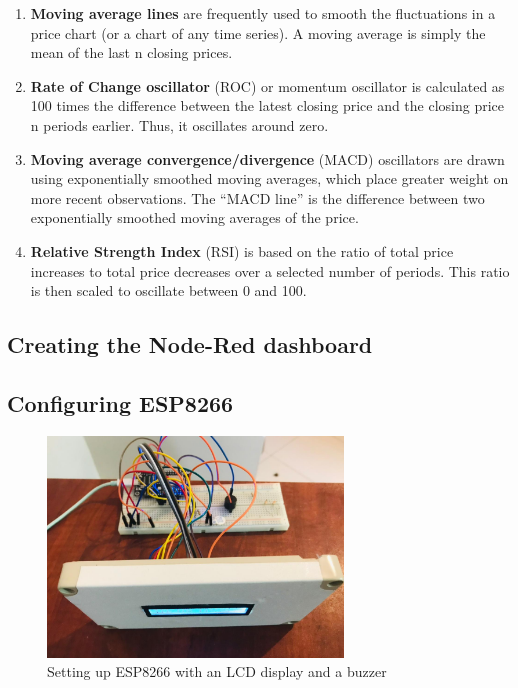 \begin{enumerate}[itemsep=-1.7mm]

\item \textbf{Moving average lines} are frequently used to smooth the fluctuations in a price chart (or a chart of any time series). A moving average is simply the mean of the last n closing prices.
\item \textbf{Rate of Change oscillator} (ROC) or momentum oscillator is calculated as 100 times the difference between the latest closing price and the closing price n periods earlier. Thus, it oscillates around zero.
\item \textbf{Moving average convergence/divergence} (MACD) oscillators are drawn using exponentially smoothed moving averages, which place greater weight on more recent observations. The “MACD line” is the difference between two exponentially smoothed moving averages of the price.
\item \textbf{Relative Strength Index} (RSI) is based on the ratio of total price increases to total price decreases over a selected number of periods. This ratio is then scaled to oscillate between 0 and 100.

\end{enumerate}


\subsection{Creating the Node-Red dashboard}

\subsection{Configuring ESP8266}

\begin{figure}[h]
    \centering
      \includegraphics[width=0.7\textwidth]{images/front.png}
    \caption{Setting up ESP8266 with an LCD display and a buzzer}
    \label{front}
\end{figure}

